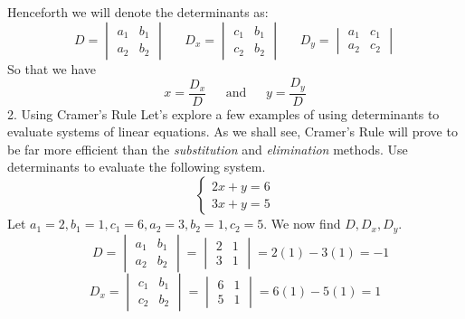 \documentclass{article}
\begin{document}
\begin{flushleft}
\linebreak
\linebreak
\linebreak
\linebreak
Henceforth we will denote the determinants as: \[D = \begin{vmatrix}a_{1} & b_{1} \\ a_{2} & b_{2}\end{vmatrix} \ \ \ \ \ \ \ D_x = \begin{vmatrix}c_{1} & b_{1} \\ c_{2} & b_{2}\end{vmatrix} \ \ \ \ \ \ \ D_y = \begin{vmatrix}a_{1} & c_{1} \\ a_{2} & c_{2}\end{vmatrix}\]
\linebreak
\linebreak
So that we have \[x = \frac{D_x}{D} \ \ \ \ \ \ \ \textrm{and} \ \ \ \ \ \ \ y = \frac{D_y}{D}\]
\linebreak
\linebreak
\linebreak
{\large{2. Using Cramer's Rule}}
\linebreak
\linebreak
Let's explore a few examples of using determinants to evaluate systems of linear equations. As we shall see, Cramer's Rule will prove to be far more efficient than the {\it{substitution}} and {\it{elimination}} methods.
\linebreak
\linebreak
{} Use determinants to evaluate the following system.
\[\begin{cases}2x + y = 6 \\ 3x + y = 5\end{cases}\]
\linebreak
\linebreak
Let $a_1 = 2, b_1 = 1, c_1 = 6, a_2 = 3, b_2 = 1, c_2 = 5$. We now find $D, D_x, D_y$.
\[ \ \ \ \ D = \begin{vmatrix}a_{1} & b_{1} \\ a_{2} & b_{2}\end{vmatrix} = \begin{vmatrix}2 & 1 \\ 3 & 1\end{vmatrix} = 2(1) - 3(1) = -1\]
\[D_x = \begin{vmatrix}c_{1} & b_{1} \\ c_{2} & b_{2}\end{vmatrix} = \begin{vmatrix}6 & 1 \\ 5 & 1\end{vmatrix} = 6(1) - 5(1) = 1\]

\end{flushleft}
\end{document}
